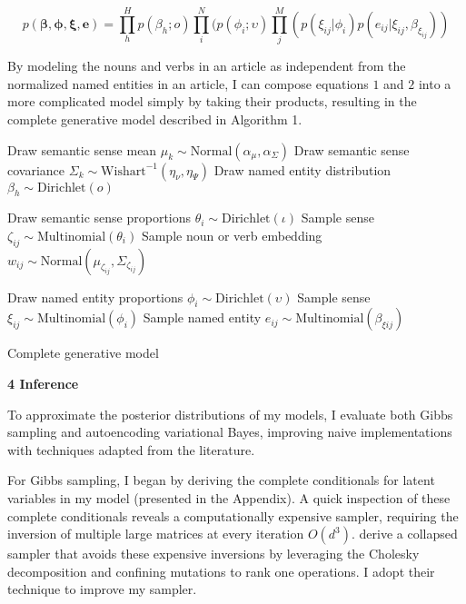 \documentclass[12pt]{article}
\begin{document}
\begin{equation}
p(\bm{\beta}, \bm{\phi}, \bm{\xi}, \bm{e}) = \prod^{H}_{h} p(\beta_h; o)\prod^N_{i}(p(\phi_i; \upsilon)\prod^M_{j}(p(\xi_{ij} | \phi_i)p(e_{ij} | \xi_{ij}, \beta_{\xi_{ij}}))
\end{equation}

By modeling the nouns and verbs in an article as independent from the normalized named entities in an article, I can compose equations $1$ and $2$ into a more complicated model simply by taking their products, resulting in the complete generative model described in Algorithm 1.  

\begin{algorithm}[H]
\SetAlgoLined
{} {
 	Draw semantic sense mean $\mu_k \sim \text{Normal}(\alpha_\mu, \alpha_\Sigma)$\;
 	Draw semantic sense covariance $\Sigma_k \sim \text{Wishart}^{-1}(\eta_\nu, \eta_\Psi)$\;
 }
  {
 	Draw named entity distribution $\beta_h \sim \text{Dirichlet}(o)$\;
 }
  {
 	Draw semantic sense proportions $\theta_i \sim \text{Dirichlet}(\iota)$\;
 	 {
		Sample sense $\zeta_{ij} \sim \text{Multinomial}(\theta_i)$\; 	
		Sample noun or verb embedding $w_{ij} \sim \text{Normal}(\mu_{\zeta_{ij}}, \Sigma_{\zeta_{ij}})$\;
 	}
 	
 	Draw named entity proportions $\phi_i \sim \text{Dirichlet}(\upsilon)$\;
 	 {
		Sample sense $\xi_{ij} \sim \text{Multinomial}(\phi_i)$\; 	
		Sample named entity $e_{ij} \sim \text{Multinomial}(\beta_{\xi{ij}})$\;
 	}
 }
 \caption{Complete generative model}
\end{algorithm}

\textbf{4 Inference}

To approximate the posterior distributions of my models, I evaluate both Gibbs sampling and autoencoding variational Bayes, improving naive implementations with techniques adapted from the literature.

For Gibbs sampling, I began by deriving the complete conditionals for latent variables in my model (presented in the Appendix).  A quick inspection of these complete conditionals reveals a computationally expensive sampler, requiring the inversion of multiple large matrices at every iteration $O(d^3)$.  \cite{das2015gaussian} derive a collapsed sampler that avoids these expensive inversions by leveraging the Cholesky decomposition and confining mutations to rank one operations.  I adopt their technique to improve my sampler.
\end{document}
